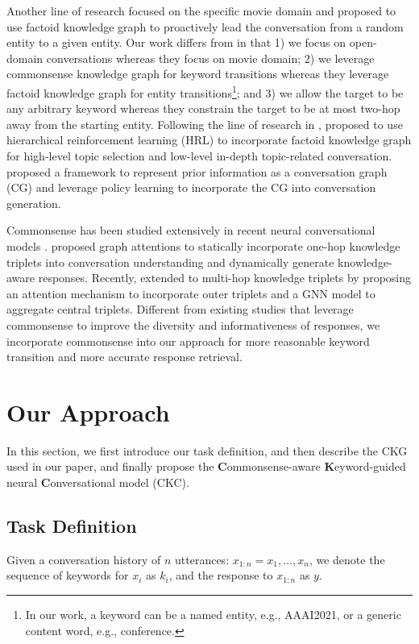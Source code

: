 \documentclass[letterpaper]{article} %
\begin{document}
Another line of research \cite{wu2019proactive} focused on the specific movie domain and proposed to use factoid knowledge graph to proactively lead the conversation from a random entity to a given entity. Our work differs from \cite{wu2019proactive} in that 1) we focus on open-domain conversations whereas they focus on movie domain; 2) we leverage commonsense knowledge graph for keyword transitions whereas they leverage factoid knowledge graph for entity transitions\footnote{In our work, a keyword can be a named entity, e.g., AAAI2021, or a generic content word, e.g., conference.}; and 3) we allow the target to be any arbitrary keyword whereas they constrain the target to be at most two-hop away from the starting entity. Following the line of research in \cite{wu2019proactive}, \citet{xu2020knowledge} proposed to use hierarchical reinforcement learning (HRL) to incorporate factoid knowledge graph for high-level topic selection and low-level in-depth topic-related conversation. \citet{xu2020conversational} proposed a framework to represent prior information as a conversation graph (CG) and leverage policy learning to incorporate the CG into conversation generation.

Commonsense has been studied extensively in recent neural conversational models \cite{young2018augmenting, zhou2018commonsense, zhang2020grounded, zhong2020care}. 
\citet{zhou2018commonsense} proposed graph attentions to statically incorporate one-hop knowledge triplets into conversation understanding and dynamically generate knowledge-aware responses. Recently, \citet{zhang2020grounded} extended \cite{zhou2018commonsense} to multi-hop knowledge triplets by proposing an attention mechanism to incorporate outer triplets and a GNN model to aggregate central triplets. Different from existing studies that leverage commonsense to improve the diversity and informativeness of responses, we incorporate commonsense into our approach for more reasonable keyword transition and more accurate response retrieval.

\section{Our Approach}
\label{sec: our approach}
In this section, we first introduce our task definition, and then describe the CKG used in our paper, and finally propose the \textbf{C}ommonsense-aware \textbf{K}eyword-guided neural \textbf{C}onversational model (CKC).

\subsection{Task Definition}
\label{sec: task definition}
Given a conversation history of $n$ utterances: $x_{1:n} = x_1, ..., x_n$, we denote the sequence of keywords for $x_i$ as $k_i$, and the response to $x_{1:n}$ as $y$. 
\end{document}
